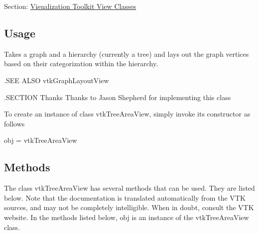 Section\-: \hyperlink{sec_vtkviews}{Visualization Toolkit View Classes} \hypertarget{vtkwidgets_vtkxyplotwidget_Usage}{}\subsection{Usage}\label{vtkwidgets_vtkxyplotwidget_Usage}
Takes a graph and a hierarchy (currently a tree) and lays out the graph vertices based on their categorization within the hierarchy.

.S\-E\-E A\-L\-S\-O vtk\-Graph\-Layout\-View

.S\-E\-C\-T\-I\-O\-N Thanks Thanks to Jason Shepherd for implementing this class

To create an instance of class vtk\-Tree\-Area\-View, simply invoke its constructor as follows \begin{DoxyVerb}  obj = vtkTreeAreaView
\end{DoxyVerb}
 \hypertarget{vtkwidgets_vtkxyplotwidget_Methods}{}\subsection{Methods}\label{vtkwidgets_vtkxyplotwidget_Methods}
The class vtk\-Tree\-Area\-View has several methods that can be used. They are listed below. Note that the documentation is translated automatically from the V\-T\-K sources, and may not be completely intelligible. When in doubt, consult the V\-T\-K website. In the methods listed below, {\ttfamily obj} is an instance of the vtk\-Tree\-Area\-View class. 
